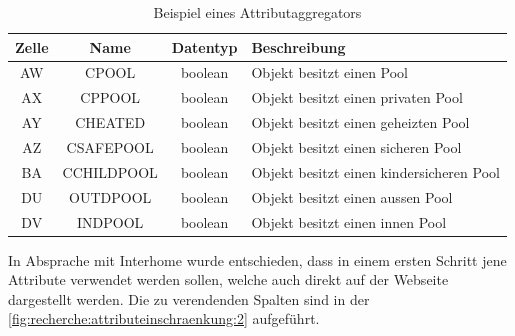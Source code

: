 \begin{table}[H] 
	\caption{Beispiel eines Attributaggregators}
	\centering
		\label{fig:recherche:attributeinschraenkung:1}
	\begin{tabular}{ | c | c | c | l | } 
		\hline 
		\rowcolor{tableheadcolor}
		\bfseries Zelle & \bfseries Name & \bfseries Datentyp & \bfseries Beschreibung \\ \hline 
		AW & CPOOL & boolean & Objekt besitzt einen Pool \\ \hline 
		AX & CPPOOL & boolean & Objekt besitzt einen privaten Pool \\ \hline 
		AY & CHEATED & boolean & Objekt besitzt einen geheizten Pool \\ \hline 
		AZ & CSAFEPOOL & boolean & Objekt besitzt einen sicheren Pool \\ \hline 
		BA & CCHILDPOOL & boolean & Objekt besitzt einen kindersicheren Pool \\ \hline 
		DU & OUTDPOOL & boolean & Objekt besitzt einen aussen Pool \\ \hline 
		DV & INDPOOL & boolean & Objekt besitzt einen innen Pool \\ \hline 
	\end{tabular}
\end{table}

In Absprache mit Interhome wurde entschieden, dass in einem ersten Schritt jene Attribute verwendet werden sollen, welche auch direkt auf der Webseite dargestellt werden. Die zu verendenden Spalten sind in der \cref{fig:recherche:attributeinschraenkung:2} aufgeführt.

